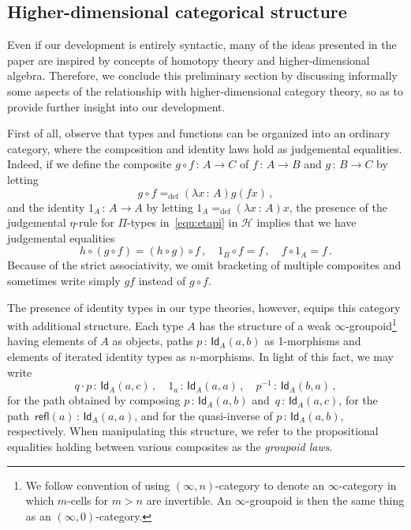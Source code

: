 \documentclass[10pt,a4paper,oneside,reqno]{amsart}
\numberwithin{equation}{section}
\theoremstyle{mythm}
\theoremstyle{mydef}
\theoremstyle{myrmk}
\newcommand{\defeq}{=_{\mathrm{def}}}
\newcommand{\co}{\,{:}\,}
\newcommand{\ct}{\cdot}
\newcommand{\Hint}{\mathcal{H}}
\newcommand{\Id}{\mathsf{Id}}
\newcommand{\refl}{\mathsf{refl}}
\begin{document}
\subsection{Higher-dimensional categorical structure} Even if our development is entirely syntactic,
many of the ideas presented in the paper are inspired by concepts of homotopy theory and higher-dimensional
algebra. Therefore, we conclude this preliminary section by  discussing informally some aspects of the relationship with higher-dimensional category theory, so as to provide further insight into our development.

 First of all, observe that types and functions can be organized into an ordinary 
 category, where the composition and identity laws hold as judgemental equalities. Indeed, if we define the composite $g \circ f \co A 
\to C$ of $f \co A \to B$ and $g \co B \to C$ by letting
\[
 g \circ f \defeq (\lambda x \co A) g ( f  x) \, ,
 \]
 and the identity $1_A \co A \to A$ by letting $1_A \defeq (\lambda x \co A) x$, 
 the presence of the judgemental $\eta$-rule for $\Pi$-types in~\eqref{equ:etapi} in $\Hint$ implies that
 we have judgemental equalities
 \[
  h \circ (g \circ f) = (h \circ g) \circ f \, , \quad 1_B \circ f =  f \, , \quad  f \circ 1_A = f \, .
  \] 
  Because of the strict associativity, we omit bracketing of multiple composites and sometimes write simply $gf$ instead of $g \circ f$. 

The presence of identity types in our type theories, however, equips this category with additional structure. Each  type $A$ has the structure of a weak $\infty$-groupoid\footnote{We follow convention of using $(\infty, n)$-category to denote an $\infty$-category in which $m$-cells for $m > n$ are invertible. An $\infty$-groupoid is then the same thing as an $(\infty,0)$-category.}  having  elements of $A$ as objects, paths
$p \co \Id_A(a,b)$ as 1-morphisms and elements of iterated identity types as $n$-morphisms. 
In light of this fact, we may write 
\[
q \ct p \co \Id_A(a,c) \, , \quad
1_a \co \Id_A(a,a) \, , \quad 
p^{-1} \co \Id_A(b,a) \, ,
\]
for the path obtained by composing $p \co \Id_A(a,b)$ and~$q \co \Id_A(a,c)$,  for the path~$\refl(a) \co \Id_A(a,a)$, and for the quasi-inverse of $p \co \Id_A(a,b)$, respectively. 
When manipulating this structure, we  refer to the  propositional equalities holding between 
various composites as the \emph{groupoid laws}.
\end{document}
